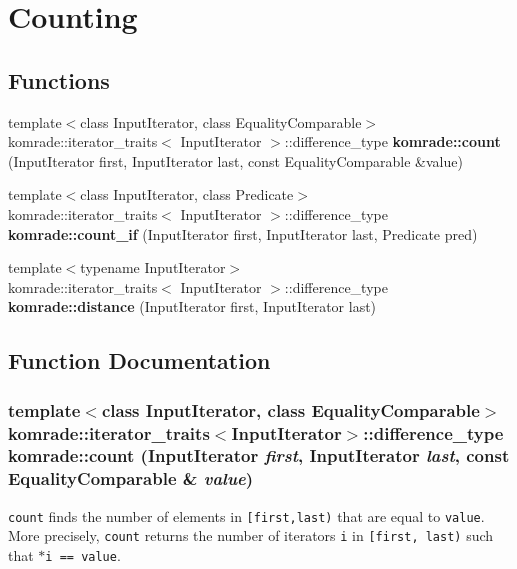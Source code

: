 \section{Counting}
\label{group__counting}
\subsection*{Functions}
\begin{CompactItemize}
\item 
{\footnotesize template$<$class InputIterator, class EqualityComparable$>$ }\\komrade::iterator\_\-traits$<$ InputIterator $>$::difference\_\-type {\bf komrade::count} (InputIterator first, InputIterator last, const EqualityComparable \&value)
\item 
{\footnotesize template$<$class InputIterator, class Predicate$>$ }\\komrade::iterator\_\-traits$<$ InputIterator $>$::difference\_\-type {\bf komrade::count\_\-if} (InputIterator first, InputIterator last, Predicate pred)
\item 
{\footnotesize template$<$typename InputIterator$>$ }\\komrade::iterator\_\-traits$<$ InputIterator $>$::difference\_\-type {\bf komrade::distance} (InputIterator first, InputIterator last)
\end{CompactItemize}


\subsection{Function Documentation}
\subsubsection[count]{\setlength{\rightskip}{0pt plus 5cm}template$<$class InputIterator, class EqualityComparable$>$ komrade::iterator\_\-traits$<$InputIterator$>$::difference\_\-type komrade::count (InputIterator {\em first}, \/  InputIterator {\em last}, \/  const EqualityComparable \& {\em value})\hspace{0.3cm}{\tt  [inline]}}\label{group__counting_g75b2a97fcdcf1766ff9a86b67050036c}


{\tt count} finds the number of elements in {\tt [first,last)} that are equal to {\tt value}. More precisely, {\tt count} returns the number of iterators {\tt i} in {\tt [first, last)} such that {\tt $\ast$i == value}.

